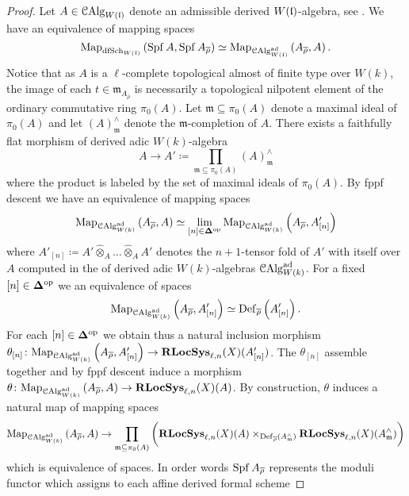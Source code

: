 \documentclass[10pt,a4paper]{amsart}
\numberwithin{equation}{subsection}
\theoremstyle{plain}
\theoremstyle{definition}
\theoremstyle{remark}
\numberwithin{equation}{section}
\begin{document}
\begin{proof}
Let $A \in \mathcal{C}\mathrm{Alg}^{}_{W(\mathfrak l)}$ denote an admissible derived $W(\mathfrak l)$-algebra, see \cite[Definition 3.1.1]{me2}. We have an equivalence of mapping spaces
	\[
		\mathrm{Map}_{\mathrm{dfSch}_{W(\mathfrak l)}} \left( \operatorname{Spf} A, \operatorname{Spf} A_{\overline{\rho}} \right) \simeq \mathrm{Map}_{\mathcal{C}\mathrm{Alg}_{W(\mathfrak l)}^{\mathrm{ad}}} \left( A_{\overline{\rho}}, A \right).
	\]
Notice that as $A$ is a $\ell$-complete topological almost of finite type over $W(k)$, the image of each $t \in \mathfrak m_{A_{\overline{\rho}}}$ is necessarily a topological nilpotent element of the ordinary commutative ring $\pi_0(A)$.
Let $\mathfrak m \subseteq \pi_0(A)$ denote a maximal ideal of $\pi_0(A)$ and let $\left( A\right)^{\wedge}_{\mathfrak{m}}$ denote the $\mathfrak m$-completion of $A$.
There exists a faithfully flat morphism of derived adic $W(k)$-algebra
	\[
		A \to A' \coloneqq \prod_{\mathfrak m \subseteq \pi_0(A)} 	\left( A \right)^\wedge_{\mathfrak{m}}
	\]
where the product is labeled by the set of maximal ideals of $\pi_0(A)$. By fppf descent we have an equivalence of mapping spaces
	\begin{equation} \label{ffdes}
		 \mathrm{Map}_{\mathcal{C}\mathrm{Alg}^{\mathrm{ad}}_{W(k)}} \left( A_{\overline{\rho}}, A \right) \simeq \lim_{[n] \in \mathbf \Delta^{\mathrm{op}}} \mathrm{Map}_{\mathcal{C}\mathrm{Alg}_{W(k)}^{\mathrm{ad}}} \left( A_{\overline{\rho}}, A'_{[n]} \right) 
	\end{equation}
where $A'_{[n]} \coloneqq A' \widehat{\otimes}_A \dots \widehat{\otimes}_A A'$ denotes the $n+1$-tensor fold of $A'$ with itself over $A$ computed in the \infcat of derived adic $W(k)$-algebras $\mathcal{C}\mathrm{Alg}_{W(k)}^{\mathrm{ad}}$.
For a fixed $[n] \in \mathbf \Delta^{\mathrm{op}}$ we an equivalence of spaces
	\[
		\mathrm{Map}_{\mathcal{C}\mathrm{Alg}^{\mathrm{ad}}_{W(k)} } \left( A_{\overline{\rho}}, A'_{[n]} \right) \simeq
		  \mathbf{\mathrm{Def}}_{\overline{\rho}} \left( A'_{[n]} \right).
	\]
For each $[n] \in \mathbf \Delta^{\mathrm{op}}$ we obtain thus a natural inclusion morphism $\theta_{[n]} \colon \mathrm{Map}_{\mathcal{C}\mathrm{Alg}^{\mathrm{ad}}_{W(k)}} \left( A_{\overline{\rho}}, A'_{[n]} \right) \to \mathbf R \mathbf{LocSys}_{\ell, n}(X)(A'_{[n]})$.  The $\theta_{[n]}$ assemble together and by fppf descent induce
a morphism $\theta \colon \mathrm{Map}_{\mathcal{C}\mathrm{Alg}^{\mathrm{ad}}_{W(k)}} \left( A_{\overline{\rho}}, A \right) \to \mathbf R \mathbf{LocSys}_{\ell, n}(X) (A)$. By construction, $\theta$ induces a natural map of mapping spaces	
	\[
		\mathrm{Map}_{\mathcal{C}\mathrm{Alg}^{\mathrm{ad}}_{W(k)}} \left( A_{\overline{\rho}}, A \right) \to \prod_{\mathfrak m \subseteq \pi_0(A)} \bigg( \mathbf R \mathbf{LocSys}_{\ell, n}(X)(A) \times_{\mathbf{\mathrm{Def}}_{\overline{\rho}} \left( A^\wedge_{\mathfrak m} \right)} \mathbf R \mathbf{LocSys}_{\ell, n}(X)(A^\wedge_{\mathfrak m}) 
		\bigg)
	\]
which is equivalence of spaces.
In order words $\operatorname{Spf} A_{\overline{\rho}}$ represents the moduli functor which assigns to each affine derived formal scheme

\end{proof}
\end{document}
